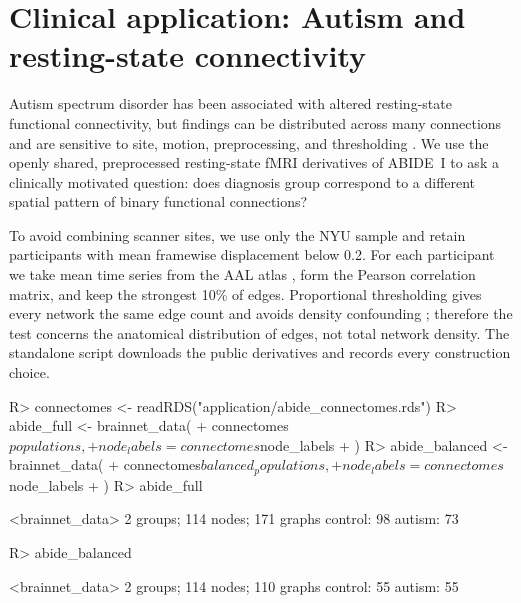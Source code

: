 \documentclass[article]{jss}\usepackage[]{graphicx}\usepackage[]{xcolor}
\begin{document}
\section{Clinical application: Autism and resting-state connectivity}
\label{sec:application}

Autism spectrum disorder has been associated with altered resting-state
functional connectivity, but findings can be distributed across many
connections and are sensitive to site, motion, preprocessing, and
thresholding \citep{DiMartino2014}. We use the openly shared, preprocessed
resting-state fMRI derivatives of ABIDE~I
\citep{DiMartino2014,Craddock2013} to ask a clinically motivated question:
does diagnosis group correspond to a different spatial pattern of binary
functional connections?

To avoid combining scanner sites, we use only the NYU sample and retain
participants with mean framewise displacement below 0.2. For each participant
we take mean time series from the AAL atlas
\citep{TzourioMazoyer2002}, form the Pearson correlation matrix, and keep the
strongest 10\% of edges. Proportional thresholding gives every network the
same edge count and avoids density confounding \citep{vandenHeuvel2017};
therefore the test concerns the anatomical distribution of edges, not total
network density. The standalone  script downloads
the public derivatives and records every construction choice.

\begin{Schunk}
\begin{Sinput}
R> connectomes <- readRDS("application/abide_connectomes.rds")
R> abide_full <- brainnet_data(
+    connectomes$populations,
+    node_labels = connectomes$node_labels
+  )
R> abide_balanced <- brainnet_data(
+    connectomes$balanced_populations,
+    node_labels = connectomes$node_labels
+  )
R> abide_full
\end{Sinput}
\begin{Soutput}
<brainnet_data>
2 groups; 114 nodes; 171 graphs
  control: 98
  autism: 73
\end{Soutput}
\begin{Sinput}
R> abide_balanced
\end{Sinput}
\begin{Soutput}
<brainnet_data>
2 groups; 114 nodes; 110 graphs
  control: 55
  autism: 55
\end{Soutput}
\end{Schunk}
\end{document}

